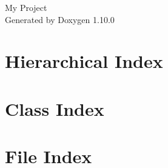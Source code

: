 \documentclass[twoside]{book}
\newcommand{\+}{\discretionary{\mbox{\scriptsize$\hookleftarrow$}}{}{}}
\newcommand{\clearemptydoublepage}{%
    \newpage{\pagestyle{empty}\cleardoublepage}%
  }
\begin{document}
  \raggedbottom
    \hypersetup{pageanchor=false,
                bookmarksnumbered=true,
                pdfencoding=unicode
               }
  \begin{titlepage}
  \vspace*{7cm}
  \begin{center}%
  {\Large My Project}\\
  \vspace*{1cm}
  {\large Generated by Doxygen 1.10.0}\\
  \end{center}
  \end{titlepage}
  \clearemptydoublepage
  \tableofcontents
  \clearemptydoublepage
  \hypersetup{pageanchor=true}
\chapter{Hierarchical Index}

\chapter{Class Index}

\chapter{File Index}

\end{document}
